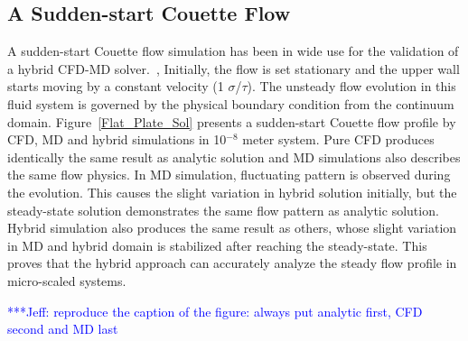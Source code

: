 \documentclass[preprint,12pt]{elsarticle}
\newcommand{\skonote}[1]{ {\textcolor{blue} { ***Jeff: #1 }}}
\newcommand{\skonote}[1]{}
\begin{document}
\subsection{A Sudden-start Couette Flow}

A sudden-start Couette flow simulation has been in wide use for the validation of a hybrid CFD-MD solver.~\cite{Nie},\cite{Yen} Initially, the flow is set stationary and the upper wall starts moving by a constant velocity (1 $\sigma$/$\tau$). The unsteady flow evolution in this fluid system is governed by the physical boundary condition from the continuum domain. Figure~\ref{Flat_Plate_Sol} presents a sudden-start Couette flow profile by CFD, MD and hybrid simulations in 10$^{-8}$ meter system. Pure CFD produces identically the same result as analytic solution and MD simulations also describes the same flow physics. In MD simulation, fluctuating pattern is observed during the evolution. This causes the slight variation in hybrid solution initially, but the steady-state solution demonstrates the same flow pattern as analytic solution. Hybrid simulation also produces the same result as others, whose slight variation in MD and hybrid domain is stabilized after reaching the steady-state.
This proves that the hybrid approach can accurately analyze the steady flow profile in micro-scaled systems.

\skonote{reproduce the caption of the figure: always put analytic first, CFD second and MD last}
\end{document}
